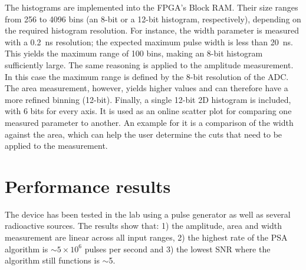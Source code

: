 \documentclass[12pt]{packages/mytustyle}  %
\begin{document}
The histograms are implemented into the FPGA's Block RAM. Their size ranges from 256 to 4096 bins (an 8-bit or a 12-bit histogram, respectively), depending on the required histogram resolution. For instance, the width parameter is measured with a 0.2~ns resolution; the expected maximum pulse width is less than 20~ns. This yields the maximum range of 100 bins, making an 8-bit histogram sufficiently large. The same reasoning is applied to the amplitude measurement. In this case the maximum range is defined by the 8-bit resolution of the ADC. The area measurement, however, yields higher values and can therefore have a more refined binning (12-bit). Finally, a single 12-bit 2D histogram is included, with 6 bits for every axis. It is used as an online scatter plot for comparing one measured parameter to another. An example for it is a comparison of the width against the area, which can help the user determine the cuts that need to be applied to the measurement.




























\clearpage
\section{Performance results}
\label{sec:perres}
The device has been tested in the lab using a pulse generator as well as several radioactive sources. The results show that: 1) the amplitude, area and width measurement are linear across all input ranges, 2) the highest rate of the PSA algorithm is $\sim5\times10^6$ pulses per second and 3) the lowest SNR where the algorithm still functions is $\sim$5.  
\end{document}
